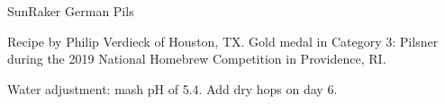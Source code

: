 \begin{recipe}{SunRaker German Pils} %

\begin{aboutblock}
Recipe by Philip Verdieck of Houston, TX. Gold medal in Category 3: Pilsner
during the 2019 National Homebrew Competition in Providence, RI. \sourceaha
\end{aboutblock}


\begin{methodandtiming}
 
\begin{mashsteps}
\end{mashsteps}

\begin{fermentationsteps}
\end{fermentationsteps}

\begin{directions}
Water adjustment: mash pH of 5.4. Add dry hops on day 6.
\end{directions}

\end{methodandtiming}

\recipebreak

\begin{ingredientsblock}

\begin{malts}
\end{malts}

\begin{hops}
\end{hops}


\end{ingredientsblock}

\end{recipe}
